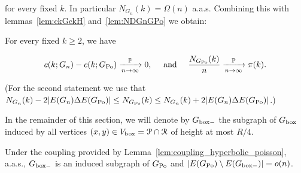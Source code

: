 \noindent
for every fixed $k$.
In particular $N_{G_n}(k) = \Omega(n)$ a.a.s. Combining this with lemmas~\ref{lem:ckGckH} and~\ref{lem:NDGnGPo} we obtain:

\begin{corollary}\label{cor:pok} 
For every fixed $k\geq 2$, we have

$$ c(k; G_n)-c(k; G_{{\mathrm{Po}}}) \xrightarrow[n\to\infty]{\mathbb{P}} 0, \quad\text{ and }\quad
\frac{N_{G_{{\mathrm{Po}}}}(k)}{n} \xrightarrow[n\to\infty]{\mathbb{P}} {\pi}(k). $$

\end{corollary}

\noindent
(For the second statement we use that $N_{G_n}(k) - 2|E(G_n)\Delta E(G_{{\mathrm{Po}}})| \leq N_{G_{{\mathrm{Po}}}}(k) \leq N_{G_n}(k) + 2|E(G_n)\Delta E(G_{{\mathrm{Po}}})|$.)

In the remainder of this section, we will denote by $G_{\mathrm{box}-}$ the subgraph of $G_{\mathrm{box}}$ induced by all 
vertices $(x,y) \in V_{\text{box}} = {\mathcal P} \cap {\mathcal R}$ of height at most $R/4$.

\begin{lemma}
Under the coupling provided by Lemma~\ref{lem:coupling_hyperbolic_poisson}, a.a.s., 
$G_{\mathrm{box}-}$ is an induced subgraph of $G_{{\mathrm{Po}}}$ and $|E(G_{{\mathrm{Po}}}) \setminus E(G_{\mathrm{box}-})| = o(n)$.
\end{lemma}

